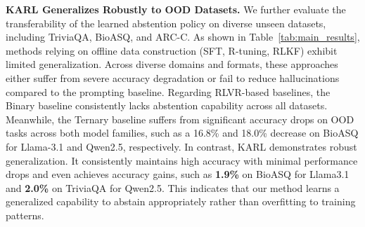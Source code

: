 \documentclass{article} %
\newcommand{\framename}{\textsc{KARL}}
\begin{document}
\noindent
\textbf{\framename{} Generalizes Robustly to OOD Datasets.}
We further evaluate the transferability of the learned abstention policy on diverse unseen datasets, including TriviaQA, BioASQ, and ARC-C.
As shown in Table~\ref{tab:main_results}, methods relying on offline data construction (SFT, R-tuning, RLKF) exhibit limited generalization.
Across diverse domains and formats, these approaches either suffer from severe accuracy degradation or fail to reduce hallucinations compared to the prompting baseline.
Regarding RLVR-based baselines, the Binary baseline consistently lacks abstention capability across all datasets.
Meanwhile, the Ternary baseline suffers from significant accuracy drops on OOD tasks across both model families, such as a 16.8\% and 18.0\% decrease on BioASQ for Llama-3.1 and Qwen2.5, respectively.
In contrast, \framename{} demonstrates robust generalization.
It consistently maintains high accuracy with minimal performance drops and even achieves accuracy gains, such as \textbf{1.9\%} on BioASQ for Llama3.1 and \textbf{2.0\%} on TriviaQA for Qwen2.5.
This indicates that our method learns a generalized capability to abstain appropriately rather than overfitting to training patterns.
\end{document}
